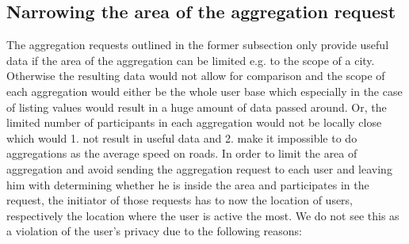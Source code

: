  \subsection{Narrowing the area of the aggregation request}
 The aggregation requests outlined in the former subsection only provide useful data if the area of the aggregation can be limited e.g. to the scope of a city. Otherwise the resulting data would not allow for comparison and the scope of each aggregation would either be the whole user base which especially in the case of listing values would result in a huge amount of data passed around. Or, the limited number of participants in each aggregation would not be locally close which would 1. not result in useful data and 2. make it impossible to do aggregations as the average speed on roads. 
 In order to limit the area of aggregation and avoid sending the aggregation request to each user and leaving him with determining whether he is inside the area and participates in the request, the initiator of those requests has to now the location of users, respectively the location where the user is active the most.
 We do not see this as a violation of the user's privacy due to the following reasons:
